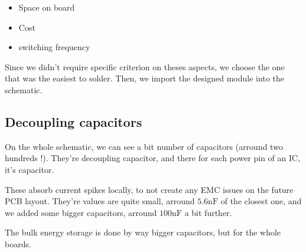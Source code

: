 \begin{itemize}[noitemsep]
    \item   Space on board
    \item   Cost
    \item   switching frequency
\end{itemize}

Since we didn't require specific criterion on theses aspects, we choose the one that
was the easiest to solder. Then, we import the designed module into the schematic.

\subsection{Decoupling capacitors}
On the whole schematic, we can see a bit number of capacitors (arround two hundreds !).
They're decoupling capacitor, and there for each power pin of an IC, it's capacitor.

These absorb current spikes locally, to not create any EMC issues on the future PCB layout.
They're values are quite small, arround $5.6 \si{\nano\farad}$ of the closest one, and we added some bigger
capacitors, arround $100 \si{\nano\farad}$ a bit further.

The bulk energy storage is done by way bigger capacitors, but for the whole boards. 
